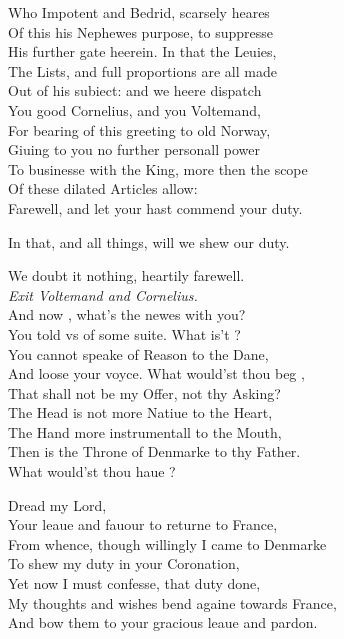 \documentclass[a5paper,DIV=calc,11pt]{scrbook}
\begin{document}
\begin{drama*}
    Who Impotent and Bedrid, scarsely heares\\
    Of this his Nephewes purpose, to suppresse\\
    His further gate heerein. In that the Leuies,\\
    The Lists, and full proportions are all made\\
    Out of his subiect: and we heere dispatch\\
    You good Cornelius, and you Voltemand,\\
    For bearing of this greeting to old Norway,\\
    Giuing to you no further personall power\\
    To businesse with the King, more then the scope\\
    Of these dilated Articles allow:\\
    Farewell, and let your hast commend your duty.
    
    \voltspeaks In that, and all things, will we shew our duty.
    
    \kingspeaks We doubt it nothing, heartily farewell.\\
    \textit{Exit Voltemand and Cornelius.}\\
    And now \laer, what's the newes with you?\\
    You told vs of some suite. What is't \laer?\\
    You cannot speake of Reason to the Dane,\\
    And loose your voyce. What would'st thou beg \laer,\\
    That shall not be my Offer, not thy Asking?\\
    The Head is not more Natiue to the Heart,\\
    The Hand more instrumentall to the Mouth,\\
    Then is the Throne of Denmarke to thy Father.\\
    What would'st thou haue \laer?

    \laerspeaks Dread my Lord,\\
    Your leaue and fauour to returne to France,\\
    From whence, though willingly I came to Denmarke\\
    To shew my duty in your Coronation,\\
    Yet now I must confesse, that duty done,\\
    My thoughts and wishes bend againe towards France,\\
    And bow them to your gracious leaue and pardon.
    

\end{drama*}
\end{document}
